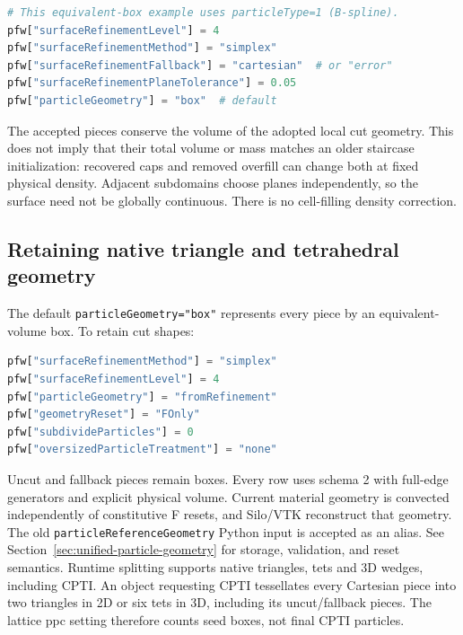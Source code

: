 \begin{lstlisting}[language=Python,caption={Local simplex cuts with equivalent-volume box geometry.}]
# This equivalent-box example uses particleType=1 (B-spline).
pfw["surfaceRefinementLevel"] = 4
pfw["surfaceRefinementMethod"] = "simplex"
pfw["surfaceRefinementFallback"] = "cartesian"  # or "error"
pfw["surfaceRefinementPlaneTolerance"] = 0.05
pfw["particleGeometry"] = "box"  # default
\end{lstlisting}

The accepted pieces conserve the volume of the adopted local cut geometry. This does not imply that their total volume or mass matches an older staircase initialization: recovered caps and removed overfill can change both at fixed physical density. Adjacent subdomains choose planes independently, so the surface need not be globally continuous. There is no cell-filling density correction.

\subsection{Retaining native triangle and tetrahedral geometry}
The default \texttt{particleGeometry="box"} represents every piece by an
equivalent-volume box. To retain cut shapes:
\begin{lstlisting}[language=Python]
pfw["surfaceRefinementMethod"] = "simplex"
pfw["surfaceRefinementLevel"] = 4
pfw["particleGeometry"] = "fromRefinement"
pfw["geometryReset"] = "FOnly"
pfw["subdivideParticles"] = 0
pfw["oversizedParticleTreatment"] = "none"
\end{lstlisting}
Uncut and fallback pieces remain boxes. Every row uses schema 2 with full-edge
generators and explicit physical volume. Current material geometry is convected
independently of constitutive F resets, and Silo/VTK reconstruct that geometry.
The old \texttt{particleReferenceGeometry} Python input is accepted as an alias.
See Section~\ref{sec:unified-particle-geometry} for storage, validation, and reset
semantics. Runtime splitting supports native triangles, tets and 3D wedges, including CPTI.
An object requesting CPTI tessellates every Cartesian piece into two triangles
in 2D or six tets in 3D, including its uncut/fallback pieces. The lattice ppc setting therefore
counts seed boxes, not final CPTI particles.

